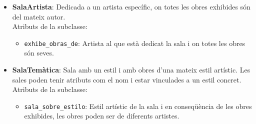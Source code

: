 \documentclass[a4paper]{article}
\begin{document}
	\begin{itemize}
		\item \textbf{SalaArtista}: Dedicada a un artista específic, on totes les obres exhibides són del mateix autor.\\
		Atributs de la subclasse:
			\begin{itemize}
				\item \texttt{exhibe\_obras\_de}: Artista al que està dedicat la sala i on totes les obres són seves.
			\end{itemize}
	\item \textbf{SalaTemàtica}: Sala amb un estil i amb obres d'una mateix estil artístic. Les sales poden tenir atributs com el nom i estar vinculades a un estil concret.\\
		Atributs de la subclasse:
		\begin{itemize}
			\item \texttt{sala\_sobre\_estilo}: Estil artístic de la sala i en conseqüència de les obres exhibides, les obres poden ser de diferents artistes.
		\end{itemize}
	\end{itemize}
		
\end{document}
